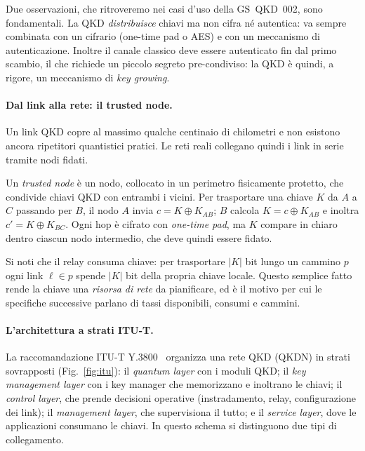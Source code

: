 Due osservazioni, che ritroveremo nei casi d'uso della GS~QKD~002, sono
fondamentali. La QKD \emph{distribuisce} chiavi ma non cifra né autentica:
va sempre combinata con un cifrario (one-time pad o AES) e con un
meccanismo di autenticazione. Inoltre il canale classico deve essere
autenticato fin dal primo scambio, il che richiede un piccolo segreto
pre-condiviso: la QKD è quindi, a rigore, un meccanismo di \emph{key
growing}.

\paragraph{Dal link alla rete: il trusted node.}
Un link QKD copre al massimo qualche centinaio di chilometri e non esistono
ancora ripetitori quantistici pratici. Le reti reali collegano quindi i
link in serie tramite nodi fidati.

\begin{definition}
Un \emph{trusted node} è un nodo, collocato in un perimetro fisicamente
protetto, che condivide chiavi QKD con entrambi i vicini. Per trasportare
una chiave $K$ da $A$ a $C$ passando per $B$, il nodo $A$ invia
$c = K \oplus K_{AB}$; $B$ calcola $K = c \oplus K_{AB}$ e inoltra
$c' = K \oplus K_{BC}$. Ogni hop è cifrato con \emph{one-time pad}, ma $K$
compare in chiaro dentro ciascun nodo intermedio, che deve quindi essere
fidato.
\end{definition}

Si noti che il relay consuma chiave: per trasportare $|K|$ bit lungo un
cammino $p$ ogni link $\ell\in p$ spende $|K|$ bit della propria chiave
locale. Questo semplice fatto rende la chiave una \emph{risorsa di rete} da
pianificare, ed è il motivo per cui le specifiche successive parlano di
tassi disponibili, consumi e cammini.

\paragraph{L'architettura a strati ITU-T.}
La raccomandazione ITU-T Y.3800~\cite{ituy3800} organizza una rete QKD
(QKDN) in strati sovrapposti (Fig.~\ref{fig:itu}): il \emph{quantum layer}
con i moduli QKD; il \emph{key management layer} con i key manager che
memorizzano e inoltrano le chiavi; il \emph{control layer}, che prende
decisioni operative (instradamento, relay, configurazione dei link); il
\emph{management layer}, che supervisiona il tutto; e il \emph{service
layer}, dove le applicazioni consumano le chiavi. In questo schema si
distinguono due tipi di collegamento.

